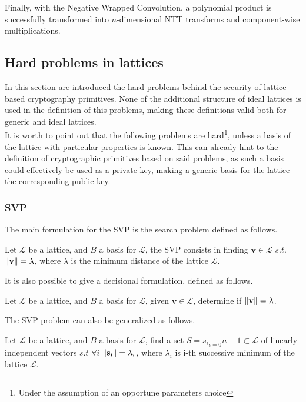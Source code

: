Finally, with the Negative Wrapped Convolution, a polynomial product is successfully transformed into $n$-dimensional NTT transforms and component-wise multiplications.

\subsection{Hard problems in lattices}\label{sec:bg:prob}
In this section are introduced the hard problems behind the security of lattice based cryptography primitives. None of the additional structure of ideal lattices is used in the definition of this problems, making these definitions valid both for generic and ideal lattices.\\
It is worth to point out that the following problems are hard\footnote{Under the assumption of an opportune parameters choice}, unless a basis of the lattice with particular properties is known. This can already hint to the definition of cryptographic primitives based on said problems, as such a basis could effectively be used as a private key, making a generic basis for the lattice the corresponding public key.

\subsubsection{SVP}

The main formulation for the SVP is the search problem defined as follows.

\begin{definition}
Let $\mathscr{L}$ be a lattice, and $B$ a basis for $\mathscr{L}$, the SVP consists in finding $\mathbf{v}\in\mathscr{L}$ $s.t.$ $\left\lVert \mathbf{v} \right\rVert = \lambda$, where $\lambda$ is the minimum distance of the lattice $\mathscr{L}$.
\end{definition}

It is also possible to give a decisional formulation, defined as follows.

\begin{definition}
Let $\mathscr{L}$ be a lattice, and $B$ a basis for $\mathscr{L}$, given $\mathbf{v}\in\mathscr{L}$, determine if $\left\lVert \mathbf{v} \right\rVert = \lambda$.
\end{definition}

The SVP problem can also be generalized as follows.

\begin{definition}
Let $\mathscr{L}$ be a lattice, and $B$ a basis for $\mathscr{L}$, find a set $S={s_i}_{i=0}{n-1}\subset \mathscr{L}$ of linearly independent vectors $s.t$ $\forall i$ $\left\lVert \mathbf{s_i} \right\rVert = \lambda_i$, where $\lambda_i$ is i-th successive minimum of the lattice $\mathscr{L}$.
\end{definition}

